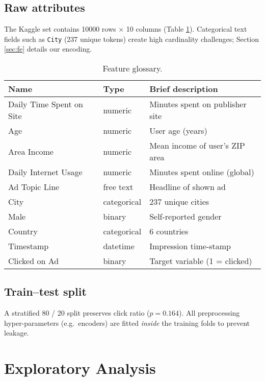 \documentclass[12pt,a4paper]{article}
\begin{document}
\subsection{Raw attributes}
The Kaggle set contains \num{10000} rows × 10 columns
(Table \ref{tab:features}).  
Categorical text fields such as \texttt{City} (237 unique tokens) create
high cardinality challenges; Section \ref{sec:fe} details our encoding.

\begin{table}[H]
  \centering
  \caption{Feature glossary.} \label{tab:features}
  \begin{tabular}{@{}lll@{}}
    \toprule
    Name                     & Type        & Brief description \\
    \midrule
    Daily Time Spent on Site & numeric     & Minutes spent on publisher site \\
    Age                      & numeric     & User age (years) \\
    Area Income              & numeric     & Mean income of user’s ZIP area \\
    Daily Internet Usage     & numeric     & Minutes spent online (global) \\
    Ad Topic Line            & free text   & Headline of shown ad \\
    City                     & categorical & 237 unique cities \\
    Male                     & binary      & Self-reported gender \\
    Country                  & categorical & 6 countries \\
    Timestamp                & datetime    & Impression time-stamp \\
    Clicked on Ad            & binary      & Target variable (1 = clicked) \\
    \bottomrule
  \end{tabular}
\end{table}

\subsection{Train–test split}
A stratified 80 / 20 split preserves click ratio
(\(p=0.164\)).  
All preprocessing hyper-parameters (e.g.\ encoders) are fitted
\emph{inside} the training folds to prevent leakage.

\section{Exploratory Analysis} \label{sec:eda}
\end{document}
